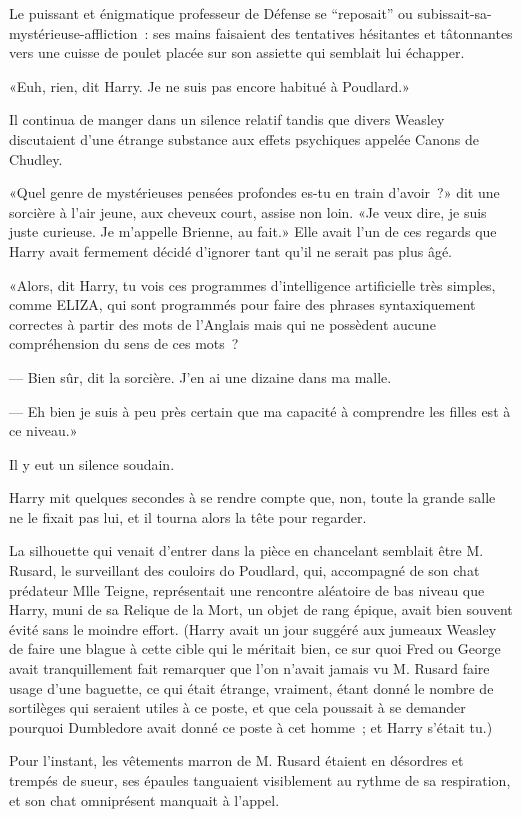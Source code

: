 Le puissant et énigmatique professeur de Défense se “reposait” ou subissait-sa-mystérieuse-affliction~: ses mains faisaient des tentatives hésitantes et tâtonnantes vers une cuisse de poulet placée sur son assiette qui semblait lui échapper.

«Euh, rien, dit Harry. Je ne suis pas encore habitué à Poudlard.»

Il continua de manger dans un silence relatif tandis que divers Weasley discutaient d'une étrange substance aux effets psychiques appelée Canons de Chudley.

«Quel genre de mystérieuses pensées profondes es-tu en train d'avoir~?» dit une sorcière à l'air jeune, aux cheveux court, assise non loin. «Je veux dire, je suis juste curieuse. Je m'appelle Brienne, au fait.» Elle avait l'un de ces regards que Harry avait fermement décidé d'ignorer tant qu'il ne serait pas plus âgé.

«Alors, dit Harry, tu vois ces programmes d'intelligence artificielle très simples, comme ELIZA, qui sont programmés pour faire des phrases syntaxiquement correctes à partir des mots de l'Anglais mais qui ne possèdent aucune compréhension du sens de ces mots~?

--- Bien sûr, dit la sorcière. J'en ai une dizaine dans ma malle.

--- Eh bien je suis à peu près certain que ma capacité à comprendre les filles est à ce niveau.»

Il y eut un silence soudain.

Harry mit quelques secondes à se rendre compte que, non, toute la grande salle ne le fixait pas lui, et il tourna alors la tête pour regarder.

La silhouette qui venait d'entrer dans la pièce en chancelant semblait être M. Rusard, le surveillant des couloirs do Poudlard, qui, accompagné de son chat prédateur Mlle Teigne, représentait une rencontre aléatoire de bas niveau que Harry, muni de sa Relique de la Mort, un objet de rang épique, avait bien souvent évité sans le moindre effort. (Harry avait un jour suggéré aux jumeaux Weasley de faire une blague à cette cible qui le méritait bien, ce sur quoi Fred ou George avait tranquillement fait remarquer que l'on n'avait jamais vu M. Rusard faire usage d'une baguette, ce qui était étrange, vraiment, étant donné le nombre de sortilèges qui seraient utiles à ce poste, et que cela poussait à se demander pourquoi Dumbledore avait donné ce poste à cet homme~; et Harry s'était tu.)

Pour l'instant, les vêtements marron de M. Rusard étaient en désordres et trempés de sueur, ses épaules tanguaient visiblement au rythme de sa respiration, et son chat omniprésent manquait à l'appel.

